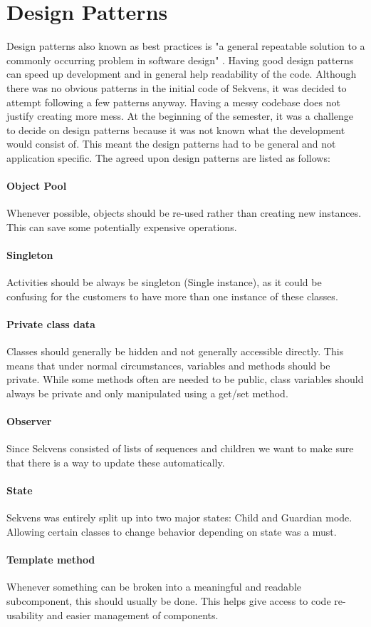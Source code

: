 \section{Design Patterns}\label{spr1_design_patterns}
Design patterns also known as best practices is "a general repeatable solution to a commonly occurring problem in software design" \cite{DesignPatterns}. Having good design patterns can speed up development and in general help readability of the code.
Although there was no obvious patterns in the initial code of Sekvens, it was decided to attempt following a few patterns anyway. Having a messy codebase does not justify creating more mess.
At the beginning of the semester, it was a challenge to decide on design patterns because it was not known what the development would consist of. This meant the design patterns had to be general and not application specific. The agreed upon design patterns are listed as follows:

\paragraph{Object Pool}
Whenever possible, objects should be re-used rather than creating new instances. This can save some potentially expensive operations.

\paragraph{Singleton}
Activities should be always be singleton (Single instance), as it could be confusing for the customers to have more than one instance of these classes.

\paragraph{Private class data}
Classes should generally be hidden and not generally accessible directly. This means that under normal circumstances, variables and methods should be private. While some methods often are needed to be public, class variables should always be private and only manipulated using a get/set method.

\paragraph{Observer}
Since Sekvens consisted of lists of sequences and children we want to make sure that there is a way to update these automatically.

\paragraph{State}
Sekvens was entirely split up into two major states: Child and Guardian mode. Allowing certain classes to change behavior depending on state was a must.

\paragraph{Template method}
Whenever something can be broken into a meaningful and readable subcomponent, this should usually be done. This helps give access to code re-usability and easier management of components.

